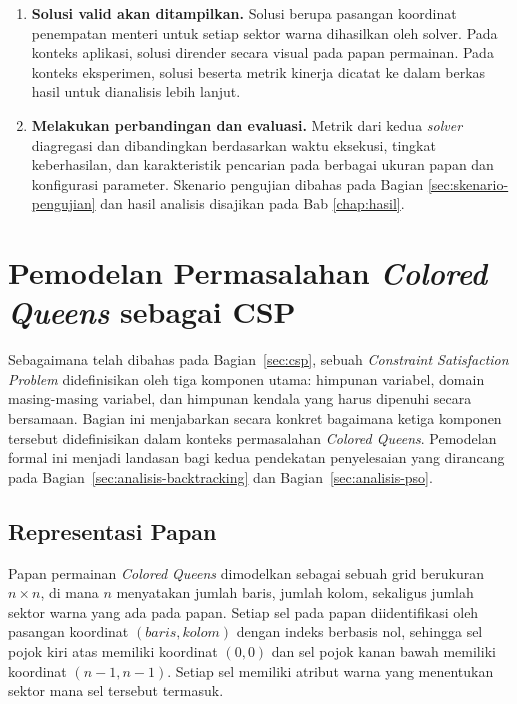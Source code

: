 \begin{enumerate}
	\item \textbf{Solusi valid akan ditampilkan.} Solusi berupa pasangan koordinat penempatan menteri untuk setiap sektor warna dihasilkan oleh solver. Pada konteks aplikasi, solusi dirender secara visual pada papan permainan. Pada konteks eksperimen, solusi beserta metrik kinerja dicatat ke dalam berkas hasil untuk dianalisis lebih lanjut.
	
	\item \textbf{Melakukan perbandingan dan evaluasi.} Metrik dari kedua \textit{solver} diagregasi dan dibandingkan berdasarkan waktu eksekusi, tingkat keberhasilan, dan karakteristik pencarian pada berbagai ukuran papan dan konfigurasi parameter. Skenario pengujian dibahas pada Bagian \ref{sec:skenario-pengujian} dan hasil analisis disajikan pada Bab \ref{chap:hasil}.
\end{enumerate}

\section{Pemodelan Permasalahan \textit{Colored Queens} sebagai CSP}
\label{sec:pemodelan-csp}

Sebagaimana telah dibahas pada Bagian~\ref{sec:csp}, sebuah \textit{Constraint Satisfaction Problem} didefinisikan oleh tiga komponen utama: himpunan variabel, domain masing-masing variabel, dan himpunan kendala yang harus dipenuhi secara bersamaan. Bagian ini menjabarkan secara konkret bagaimana ketiga komponen tersebut didefinisikan dalam konteks permasalahan \textit{Colored Queens}. Pemodelan formal ini menjadi landasan bagi kedua pendekatan penyelesaian yang dirancang pada Bagian~\ref{sec:analisis-backtracking} dan Bagian~\ref{sec:analisis-pso}.

\subsection{Representasi Papan}
\label{subsec:representasi-papan}

Papan permainan \textit{Colored Queens} dimodelkan sebagai sebuah grid berukuran $n \times n$, di mana $n$ menyatakan jumlah baris, jumlah kolom, sekaligus jumlah sektor warna yang ada pada papan. Setiap sel pada papan diidentifikasi oleh pasangan koordinat $(\textit{baris}, \textit{kolom})$ dengan indeks berbasis nol, sehingga sel pojok kiri atas memiliki koordinat $(0, 0)$ dan sel pojok kanan bawah memiliki koordinat $(n-1, n-1)$. Setiap sel memiliki atribut warna yang menentukan sektor mana sel tersebut termasuk.


